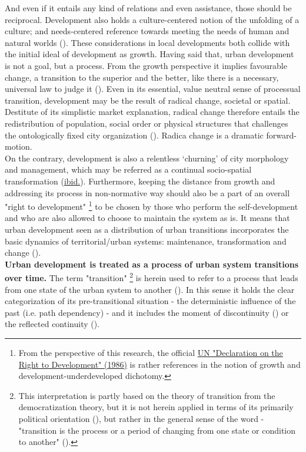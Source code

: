 \documentclass[11pt]{report}
\begin{document}
And even if it entails any kind of relations and even assistance, those should be reciprocal.
Development also holds a culture-centered notion of the unfolding of a culture; and needs-centered reference towards meeting the needs of human and natural worlds (\href{Galtung}{\citealt{galtung_peace_1996}}).
These considerations in local developments both collide with the initial ideal of development as growth.
Having said that, urban development is not a goal, but a process.
From the growth perspective it implies favourable change, a transition to the superior and the better, like there is a necessary, universal law to judge it (\href{Esteva}{\citealt{esteva_development_2010}}).
Even in its essential, value neutral sense of processual transition, development may be the result of radical change, societal or spatial.
Destitute of its simplistic market explanation, radical change therefore entails the redistribution of population, social order or physical structures that challenges the ontologically fixed city organization (\href{Brenner}{\citealt{brenner_urban_2014}}).
Radica change is a dramatic forward-motion.
\\

On the contrary, development is also a relentless ‘churning’ of city morphology and management, which may be referred as a continual socio-spatial transformation (\href{Brenner}{ibid.}).
Furthermore, keeping the distance from growth and addressing its process in non-normative way should also be a part of an overall "right to development"
\footnote{From the perspective of this research, the official \href{UN}{UN "Declaration on the Right to Development" (1986)} is rather references in the notion of growth and development-underdeveloped dichotomy.}
to be chosen by those who perform the self-development and who are also allowed to choose to maintain the system as is.
It means that urban development seen as a distribution of urban transitions incorporates the basic dynamics of territorial/urban systems: maintenance, transformation and change (\href{Friedmann}{\citealt{friedmann_planning_1987}}).
\\

\textbf{Urban development is treated as a process of urban system transitions over time.}
The term "transition"
\footnote{This interpretation is partly based on the theory of transition from the democratization theory, but it is not herein applied in terms of its primarily political orientation (\href{Offe}{\cite{Offe1997}}), but rather in the general sense of the word - "transition is the process or a period of changing from one state or condition to another" (\href{Oxford}{\cite{OxfordDictionary?????}}).}
is herein used to refer to a process that leads from one state of the urban system to another
(\href{Stark}{\cite{Stark199}}).
In this sense it holds the clear categorization of its pre-transitional situation - the deterministic influence of the past (i.e. path dependency) - and it includes the moment of discontinuity (\href{Thomas}{\citealt{thomas_thinking_1998}}) or the reflected continuity (\href{Nedovic}{\citealt{nedovic-budic_mornings_2011}}).
\\
\end{document}
